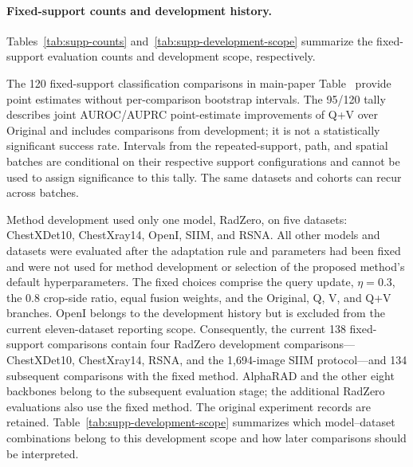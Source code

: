 \paragraph{Fixed-support counts and development history.}
Tables~\ref{tab:supp-counts} and~\ref{tab:supp-development-scope} summarize the fixed-support evaluation counts and development scope, respectively.

The 120 fixed-support classification comparisons in main-paper Table~ provide point estimates without per-comparison bootstrap intervals. The 95/120 tally describes joint AUROC/AUPRC point-estimate improvements of Q+V over Original and includes comparisons from development; it is not a statistically significant success rate. Intervals from the repeated-support, path, and spatial batches are conditional on their respective support configurations and cannot be used to assign significance to this tally. The same datasets and cohorts can recur across batches.

Method development used only one model, RadZero, on five datasets: ChestXDet10, ChestXray14, OpenI, SIIM, and RSNA. All other models and datasets were evaluated after the adaptation rule and parameters had been fixed and were not used for method development or selection of the proposed method's default hyperparameters. The fixed choices comprise the query update, $\eta=0.3$, the 0.8 crop-side ratio, equal fusion weights, and the Original, Q, V, and Q+V branches. OpenI belongs to the development history but is excluded from the current eleven-dataset reporting scope. Consequently, the current 138 fixed-support comparisons contain four RadZero development comparisons---ChestXDet10, ChestXray14, RSNA, and the 1,694-image SIIM protocol---and 134 subsequent comparisons with the fixed method. AlphaRAD and the other eight backbones belong to the subsequent evaluation stage; the additional RadZero evaluations also use the fixed method. The original experiment records are retained.
Table~\ref{tab:supp-development-scope} summarizes which model--dataset combinations belong to this development scope and how later comparisons should be interpreted.

